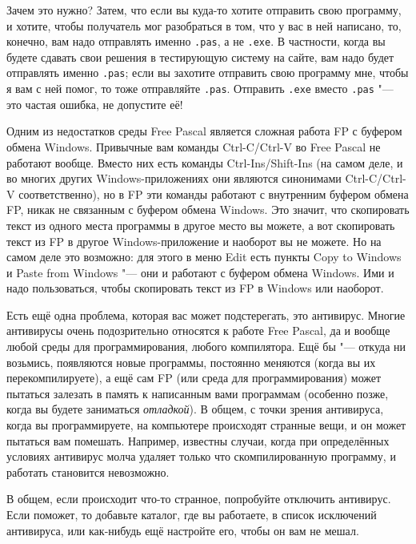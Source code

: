 Зачем это нужно? Затем, что если вы куда-то хотите отправить свою программу, и хотите, чтобы 
получатель мог разобраться в том, что у вас в ней написано, то, конечно, вам надо отправлять именно 
\verb`.pas`, а не \verb`.exe`. В частности, когда вы будете сдавать свои решения в тестирующую 
систему на сайте, вам надо будет отправлять именно \verb`.pas`; если вы захотите отправить свою 
программу мне, чтобы я вам с ней помог, то тоже отправляйте \verb`.pas`. Отправить \verb`.exe` 
вместо \verb`.pas` "--- это частая ошибка, не допустите её!

Одним из недостатков среды Free Pascal является сложная работа FP с буфером обмена Windows. Привычные вам команды Ctrl-C/Ctrl-V во Free Pascal не работают вообще. Вместо них есть команды Ctrl-Ins/Shift-Ins (на самом деле, и во многих других Windows-приложениях они являются синонимами Ctrl-C/Ctrl-V соответственно), но в FP эти команды работают с внутренним буфером обмена FP, никак не связанным с буфером обмена Windows. Это значит, что скопировать текст из одного места программы в другое место вы можете, а вот скопировать текст из FP в другое Windows-приложение и наоборот вы не можете. Но на самом деле это возможно: для этого в меню Edit есть пункты Copy to Windows и Paste from Windows "--- они и работают с буфером обмена Windows. Ими и надо пользоваться, чтобы скопировать текст из FP в Windows или наоборот.


Есть ещё одна проблема, которая вас может подстерегать, это антивирус. Многие антивирусы очень 
подозрительно относятся к работе Free Pascal, да и вообще любой среды для программирования, любого 
компилятора. Ещё бы "--- откуда ни возьмись, появляются новые программы, постоянно меняются (когда 
вы их перекомпилируете), а ещё сам FP (или среда для программирования) может пытаться залезать в 
память к написанным вами программам (особенно позже, когда вы будете заниматься \textit{отладкой}). 
В общем, с точки зрения антивируса, когда вы программируете, на компьютере происходят странные 
вещи, и он может пытаться вам помешать. Например, известны случаи, когда при определённых условиях 
антивирус молча удаляет только что скомпилированную программу, и работать становится невозможно.

В общем, если происходит что-то странное, попробуйте отключить антивирус. Если поможет, то добавьте 
каталог, где вы работаете, в список исключений антивируса, или как-нибудь ещё настройте его, чтобы 
он вам не мешал.

